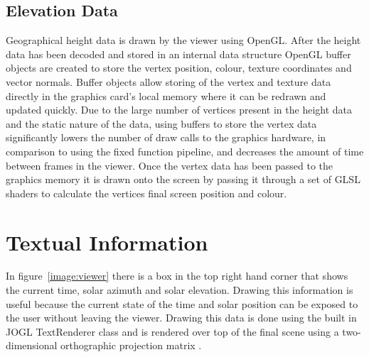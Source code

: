 \documentclass[12pt]{report}
\begin{document}
\subsection{Elevation Data}
Geographical height data is drawn by the viewer using OpenGL. After the height data has been decoded and stored in an internal data structure OpenGL buffer objects are created to store the vertex position, colour, texture coordinates and vector normals. Buffer objects allow storing of the vertex and texture data directly in the graphics card's local memory where it can be redrawn and updated quickly. Due to the large number of vertices present in the height data and the static nature of the data, using buffers to store the vertex data significantly lowers the number of draw calls to the graphics hardware, in comparison to using the fixed function pipeline, and decreases the amount of time between frames in the viewer. Once the vertex data has been passed to the graphics memory it is drawn onto the screen by passing it through a set of GLSL shaders to calculate the vertices final screen position and colour.

\section{Textual Information}
In figure~\ref{image:viewer} there is a box in the top right hand corner that shows the current time, solar azimuth and solar elevation. Drawing this information is useful because the current state of the time and solar position can be exposed to the user without leaving the viewer. Drawing this data is done using the built in JOGL TextRenderer class and is rendered over top of the final scene using a two-dimensional orthographic projection matrix .
\end{document}

